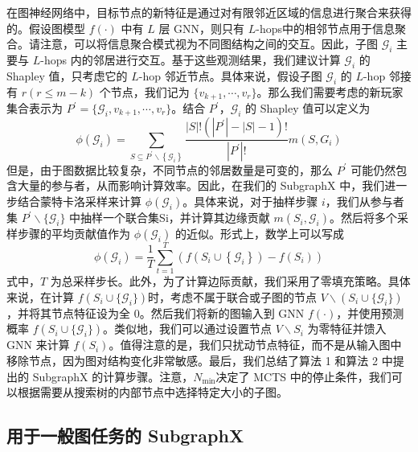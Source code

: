 \documentclass[final]{cvpr}
\begin{document}
在图神经网络中，目标节点的新特征是通过对有限邻近区域的信息进行聚合来获得的。假设图模型 $f(\cdot)$ 中有 $L$ 层 GNN，则只有 $L$-hops中的相邻节点用于信息聚合。请注意，可以将信息聚合模式视为不同图结构之间的交互。因此，子图 $\mathcal{G}_i$ 主要与 $L$-hops 内的邻居进行交互。基于这些观测结果，我们建议计算 $\mathcal{G}_i$ 的 Shapley 值，只考虑它的 $L$-hop 邻近节点。具体来说，假设子图 $\mathcal{G}_i$ 的 $L$-hop 邻接有 $r (r\le m - k)$ 个节点，我们记为 $\{v_{k+1},\cdots,v_r\}$。那么我们需要考虑的新玩家集合表示为 $P^{\prime} = \{\mathcal{G}_i, v_{k+1},\cdots,v_r\}$。结合 $P^{\prime}$，$\mathcal{G}_i$ 的 Shapley 值可以定义为
%
\begin{equation}
\phi\left(\mathcal{G}_{i}\right)=\sum_{S \subseteq P^{\prime} \backslash\left\{\mathcal{G}_{i}\right\}} \frac{|S| !\left(\left|P^{\prime}\right|-|S|-1\right) !}{\left|P^{\prime}\right| !} m\left(S, G_{i}\right)
\end{equation}
%
但是，由于图数据比较复杂，不同节点的邻居数量是可变的，那么 $P^{\prime}$ 可能仍然包含大量的参与者，从而影响计算效率。因此，在我们的 SubgraphX 中，我们进一步结合蒙特卡洛采样来计算 $\phi(\mathcal{G}_i)$。具体来说，对于抽样步骤 $i$，我们从参与者集 $P^{\prime} \backslash \{\mathcal{G}_i\}$ 中抽样一个联合集Si，并计算其边缘贡献 $m(S_i, \mathcal{G}_i)$。然后将多个采样步骤的平均贡献值作为 $\phi(\mathcal{G}_i)$ 的近似。形式上，数学上可以写成
%
\begin{equation}
\phi\left(\mathcal{G}_{i}\right)=\frac{1}{T} \sum_{t=1}^{T}\left(f\left(S_{i} \cup\left\{\mathcal{G}_{i}\right\}\right)-f\left(S_{i}\right)\right)
\end{equation}
%
式中，$T$ 为总采样步长。此外，为了计算边际贡献，我们采用了零填充策略。具体来说，在计算 $f(S_i\cup\{\mathcal{G}_i\})$时，考虑不属于联合或子图的节点 $V\backslash (S_i\cup\{\mathcal{G}_i\})$，并将其节点特征设为全 $0$。然后我们将新的图输入到 GNN $f(\cdot)$，并使用预测概率 $f(S_i\cup\{\mathcal{G}_i\})$。类似地，我们可以通过设置节点 $V \backslash S_i$ 为零特征并馈入 GNN 来计算 $f(S_i)$。值得注意的是，我们只扰动节点特征，而不是从输入图中移除节点，因为图对结构变化非常敏感。最后，我们总结了算法 1 和算法 2 中提出的 SubgraphX 的计算步骤。注意，$N_{\min}$决定了 MCTS 中的停止条件，我们可以根据需要从搜索树的内部节点中选择特定大小的子图。


\subsection{用于一般图任务的 SubgraphX}
\end{document}
